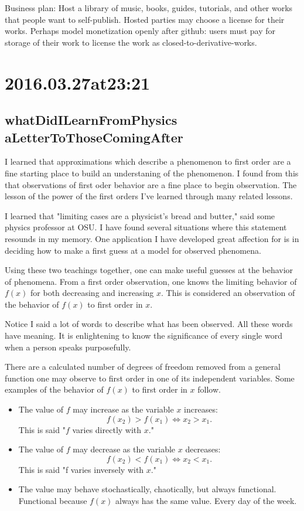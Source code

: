 \begin{enumerate}
Business plan:
Host a library of music, books, guides, tutorials, and other works that people want to self-publish. Hosted parties may choose a license for their works. Perhaps model monetization openly after github: users must pay for storage of their work to license the work as closed-to-derivative-works. 

\section*{ 2016.03.27at23:21 }
\subsection*{ whatDidILearnFromPhysics aLetterToThoseComingAfter }
I learned that approximations which describe a phenomenon to first order are a fine starting place to build an understaning of the phenomenon. I found from this that observations of first oder behavior are a fine place to begin observation. The lesson of the power of the first orders I've learned through many related lessons.

I learned that "limiting cases are a physicist's bread and butter," said some physics professor at OSU. I have found several situations where this statement resounds in my memory. One application I have developed great affection for is in deciding how to make a first guess at a model for observed phenomena.

Using these two teachings together, one can make useful guesses at the behavior of phenomena. From a first order observation, one knows the limiting behavior of $f(x)$ for both decreasing and increasing $x$. This is considered an observation of the behavior of $f(x)$ to first order in $x$.

Notice I said a lot of words to describe what has been observed. All these words have meaning. It is enlightening to know the significance of every single word when a person speaks purposefully.

There are a calculated number of degrees of freedom removed from a general function one may observe to first order in one of its independent variables. Some examples of the behavior of $f(x)$ to first order in $x$ follow.

\begin{itemize}
  \item The value of $f$ may increase as the variable $x$ increases:$$f(x_2) > f(x_1) \Leftrightarrow x_2 > x_1.$$ This is said "$f$ varies directly with $x$."
   \item The value of $f$ may decrease as the variable $x$ decreases:$$f(x_2) < f(x_1) \Leftrightarrow x_2 < x_1.$$ This is said "f varies inversely with $x$."
   \item The value may behave stochastically, chaotically, but always functional. Functional because $f(x)$ always has the same value. Every day of the week.


\end{itemize}
\end{enumerate}
